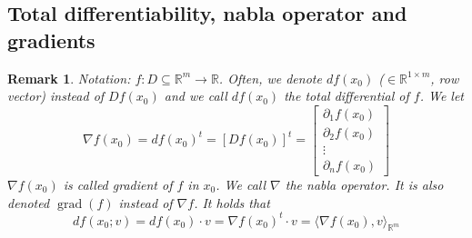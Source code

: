 \documentclass{article}
\newtheorem{remark}{Remark}  \numberwithin{remark}{section}
\begin{document}
\subsection{Total differentiability, nabla operator and gradients}
\begin{remark}
  Notation: $f: D \subseteq \mathbb R^m \to \mathbb R$.
  Often, we denote $df(x_0)$ ($\in \mathbb R^{1 \times m}$, row vector) instead of $Df(x_0)$
  and we call $df(x_0)$ the \emph{total differential of $f$}. We let
  \[
    \nabla f(x_0) = df(x_0)^t = \left[Df(x_0)\right]^t
    = \begin{bmatrix} \partial_1 f(x_0) \\ \partial_2 f(x_0) \\ \vdots \\ \partial_n f(x_0) \end{bmatrix}
  \]
  $\nabla f(x_0)$ is called \emph{gradient of $f$ in $x_0$}.
  We call $\nabla$ the \emph{nabla operator}. It is also denoted $\operatorname{grad}(f)$ instead of $\nabla f$.
  It holds that
  \[ df(x_0; v) = df(x_0) \cdot v = \nabla f(x_0)^t \cdot v = \langle \nabla f(x_0), v\rangle_{\mathbb R^m} \]
\end{remark}
\end{document}
